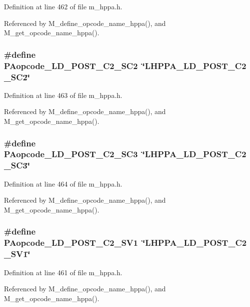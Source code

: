 Definition at line 462 of file m\_\-hppa.h.

Referenced by M\_\-define\_\-opcode\_\-name\_\-hppa(), and M\_\-get\_\-opcode\_\-name\_\-hppa().
\subsubsection{\setlength{\rightskip}{0pt plus 5cm}\#define PAopcode\_\-LD\_\-POST\_\-C2\_\-SC2~\char`\"{}LHPPA\_\-LD\_\-POST\_\-C2\_\-SC2\char`\"{}}\label{m__hppa_8h_88b8405d72b0cc2119b7c5477f688bb1}




Definition at line 463 of file m\_\-hppa.h.

Referenced by M\_\-define\_\-opcode\_\-name\_\-hppa(), and M\_\-get\_\-opcode\_\-name\_\-hppa().
\subsubsection{\setlength{\rightskip}{0pt plus 5cm}\#define PAopcode\_\-LD\_\-POST\_\-C2\_\-SC3~\char`\"{}LHPPA\_\-LD\_\-POST\_\-C2\_\-SC3\char`\"{}}\label{m__hppa_8h_5b3b488184387c6c16e9bee19a977c14}




Definition at line 464 of file m\_\-hppa.h.

Referenced by M\_\-define\_\-opcode\_\-name\_\-hppa(), and M\_\-get\_\-opcode\_\-name\_\-hppa().
\subsubsection{\setlength{\rightskip}{0pt plus 5cm}\#define PAopcode\_\-LD\_\-POST\_\-C2\_\-SV1~\char`\"{}LHPPA\_\-LD\_\-POST\_\-C2\_\-SV1\char`\"{}}\label{m__hppa_8h_35695dec15dfea3a263ce30ea4ee084d}




Definition at line 461 of file m\_\-hppa.h.

Referenced by M\_\-define\_\-opcode\_\-name\_\-hppa(), and M\_\-get\_\-opcode\_\-name\_\-hppa().
